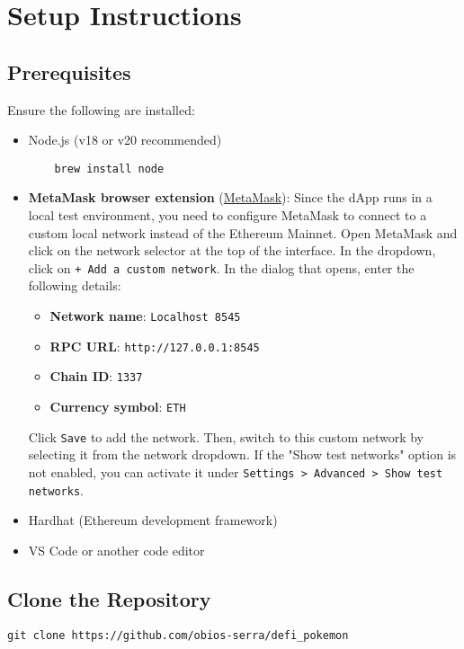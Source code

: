 \documentclass{article}
\begin{document}
\section{Setup Instructions}
\subsection{Prerequisites}
Ensure the following are installed:
\begin{itemize}
    \item Node.js (v18 or v20 recommended)
    \begin{lstlisting}
    brew install node
    \end{lstlisting}
    \item \textbf{MetaMask browser extension} (\href{https://metamask.io/}{MetaMask}): Since the dApp runs in a local test environment, you need to configure MetaMask to connect to a custom local network instead of the Ethereum Mainnet. Open MetaMask and click on the network selector at the top of the interface. In the dropdown, click on \texttt{+ Add a custom network}. In the dialog that opens, enter the following details:

    \begin{itemize}
      \item \textbf{Network name}: \texttt{Localhost 8545}
      \item \textbf{RPC URL}: \texttt{http://127.0.0.1:8545}
      \item \textbf{Chain ID}: \texttt{1337}
      \item \textbf{Currency symbol}: \texttt{ETH}
    \end{itemize}
    
    Click \texttt{Save} to add the network. Then, switch to this custom network by selecting it from the network dropdown. If the "Show test networks" option is not enabled, you can   activate it under \texttt{Settings > Advanced > Show test networks}.
    \item Hardhat (Ethereum development framework)
    \item VS Code or another code editor
\end{itemize}

\subsection{Clone the Repository}
\begin{lstlisting}
git clone https://github.com/obios-serra/defi_pokemon
\end{lstlisting}
\end{document}
